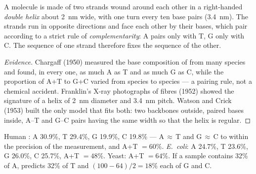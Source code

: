 \begin{proposition}\label{prop:g10:universal-dna:helix}
A  molecule is made of two strands wound around each other in a
right-handed \emph{double helix} about \qty{2}{nm}
wide, with one turn every ten base pairs (\qty{3.4}{nm}). The strands
run in opposite directions and face each other by their bases, which
pair according to a strict rule of
\emph{complementarity}: A pairs only with T, G
only with C. The sequence of one strand therefore fixes the sequence
of the other.
\end{proposition}
\begin{proof}[Evidence]
Chargaff (1950) measured the base composition of  from many species
and found, in every one, as much A as T and as much G as C, while the
proportion of A+T to G+C varied from species to species --- a pairing
rule, not a chemical accident. Franklin's X-ray photographs of 
fibres (1952) showed the signature of a helix of \qty{2}{nm} diameter
and \qty{3.4}{nm} pitch. Watson and Crick (1953) built the only model
that fits both: two backbones outside, paired bases inside, A--T and
G--C pairs having the same width so that the helix is regular.
\end{proof}

\begin{example}\label{ex:g10:universal-dna:chargaff}
Human : A 30.9\%, T 29.4\%, G 19.9\%, C 19.8\% --- A$\,\approx\,$T
and G$\,\approx\,$C to within the precision of the measurement, and
A+T $= 60\%$. \emph{E.~coli}: A 24.7\%, T 23.6\%, G 26.0\%, C 25.7\%,
A+T $= 48\%$. Yeast: A+T $= 64\%$. If a  sample contains 32\% of A,
 predicts 32\% of T and $(100 - 64)/2 = 18\%$ each of G
and C.
\end{example}

